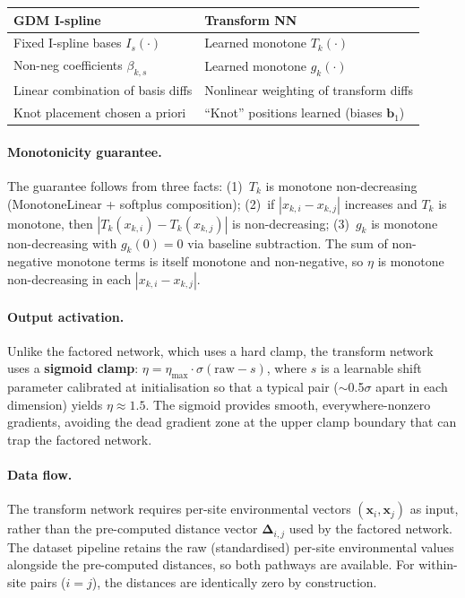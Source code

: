\documentclass{article}
\begin{document}
\begin{center}
\begin{tabular}{l|l}
    GDM I-spline & Transform NN \\
    \hline
    Fixed I-spline bases $I_s(\cdot)$ & Learned monotone $T_k(\cdot)$ \\
    Non-neg coefficients $\beta_{k,s}$ & Learned monotone $g_k(\cdot)$ \\
    Linear combination of basis diffs & Nonlinear weighting of transform diffs \\
    Knot placement chosen a priori & ``Knot'' positions learned (biases $\mathbf{b}_1$) \\
\end{tabular}
\end{center}

\paragraph{Monotonicity guarantee.}
The guarantee follows from three facts: (1)~$T_k$ is monotone non-decreasing (MonotoneLinear + softplus composition); (2)~if $|x_{k,i} - x_{k,j}|$ increases and $T_k$ is monotone, then $|T_k(x_{k,i}) - T_k(x_{k,j})|$ is non-decreasing; (3)~$g_k$ is monotone non-decreasing with $g_k(0) = 0$ via baseline subtraction. The sum of non-negative monotone terms is itself monotone and non-negative, so $\eta$ is monotone non-decreasing in each $|x_{k,i} - x_{k,j}|$.

\paragraph{Output activation.}
Unlike the factored network, which uses a hard clamp, the transform network uses a \textbf{sigmoid clamp}: $\eta = \eta_{\max} \cdot \sigma(\text{raw} - s)$, where $s$ is a learnable shift parameter calibrated at initialisation so that a typical pair ($\sim$0.5$\sigma$ apart in each dimension) yields $\eta \approx 1.5$. The sigmoid provides smooth, everywhere-nonzero gradients, avoiding the dead gradient zone at the upper clamp boundary that can trap the factored network.

\paragraph{Data flow.}
The transform network requires per-site environmental vectors $(\mathbf{x}_i, \mathbf{x}_j)$ as input, rather than the pre-computed distance vector $\bm{\Delta}_{i,j}$ used by the factored network. The dataset pipeline retains the raw (standardised) per-site environmental values alongside the pre-computed distances, so both pathways are available. For within-site pairs ($i = j$), the distances are identically zero by construction.
\end{document}
